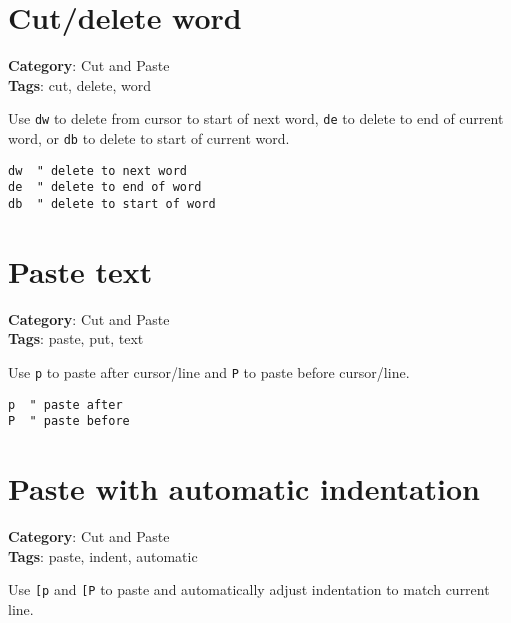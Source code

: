 {{{{\section{Cut/delete word}

\textbf{Category}: Cut and Paste\\ \textbf{Tags}: cut, delete, word
\vspace{0.5cm}

Use {\footnotesize \Verb§dw§} to delete from cursor to start of next word, {\footnotesize \Verb§de§} to delete to end of current word, or {\footnotesize \Verb§db§} to delete to start of current word.

\begin{Exa*}{}
\begin{Verbatim}[fontsize=\footnotesize, breaklines, breakanywhere]
dw  " delete to next word
de  " delete to end of word
db  " delete to start of word
\end{Verbatim}
\end{Exa*}

\section{Paste text}

\textbf{Category}: Cut and Paste\\ \textbf{Tags}: paste, put, text
\vspace{0.5cm}

Use {\footnotesize \Verb§p§} to paste after cursor/line and {\footnotesize \Verb§P§} to paste before cursor/line.

\begin{Exa*}{}
\begin{Verbatim}[fontsize=\footnotesize, breaklines, breakanywhere]
p  " paste after
P  " paste before
\end{Verbatim}
\end{Exa*}

\section{Paste with automatic indentation}

\textbf{Category}: Cut and Paste\\ \textbf{Tags}: paste, indent, automatic
\vspace{0.5cm}

Use {\footnotesize \Verb§[p§} and {\footnotesize \Verb§[P§} to paste and automatically adjust indentation to match current line.

}}}}
